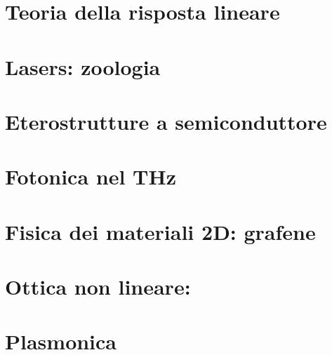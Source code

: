 \chapter{Teoria della risposta lineare}

\chapter{Lasers: zoologia}

\chapter{Eterostrutture a semiconduttore}

\chapter{Fotonica nel THz}

\chapter{Fisica dei materiali 2D: grafene}

\chapter{Ottica non lineare:}

\chapter{Plasmonica}

